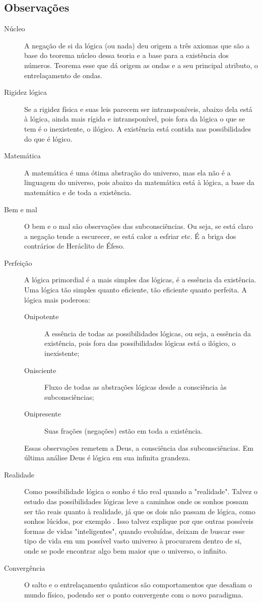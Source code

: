 \subsection{Observações}
	\begin{description}
	   \item[Núcleo] A negação de si da lógica (ou nada) deu origem a três axiomas que são a base do teorema núcleo dessa teoria e a base para a existência dos números. Teorema esse que dá origem as ondas e a seu principal atributo, o entrelaçamento de ondas. 
	   \item[Rigidez lógica] Se a rigidez física e suas leis parecem ser intransponíveis, abaixo dela está à lógica, ainda mais rígida e intransponível, pois fora da lógica o que se tem é o inexistente, o ilógico. A existência está contida nas possibilidades do que é lógico. 
	   \item[Matemática] A matemática é uma ótima abstração do universo, mas ela não é a linguagem do universo, pois abaixo da matemática está à lógica, a base da matemática e de toda a existência.
	   \item[Bem e mal] O bem e o mal são observações das subconsciências. Ou seja, se está claro a negação tende a escurecer, se está calor a esfriar etc. É a briga dos contrários de Heráclito de Éfeso.
	   \item[Perfeição] A lógica primordial é a mais simples das lógicas, é a essência da existência. Uma lógica tão simples quanto eficiente, tão eficiente quanto perfeita. A lógica mais poderosa:
	   \begin{description}
		   \item[Onipotente] A essência de todas as possibilidades lógicas, ou seja, a essência da existência, pois fora das possibilidades lógicas está o ilógico, o inexistente;
		   \item[Onisciente] Fluxo de todas as abstrações lógicas desde a consciência às subconsciências; 
		   \item[Onipresente] Suas frações (negações) estão em toda a existência.
	   \end{description}
	Essas observações remetem a Deus, a consciência das subconsciências. Em última análise Deus é lógica em sua infinita grandeza.
	   \item[Realidade] Como possibilidade lógica o sonho é tão real quando a "realidade". Talvez o estudo das possibilidades lógicas leve a caminhos onde os sonhos possam ser tão reais quanto à realidade, já que os dois não passam de lógica, como sonhos lúcidos, por exemplo \cite{ administradores_principio_pareto}. Isso talvez explique por que outras possíveis formas de vidas "inteligentes", quando evoluídas, deixam de buscar esse tipo de vida em um possível vasto universo à procurarem dentro de si, onde se pode encontrar algo bem maior que o universo, o infinito.
	   \item[Convergência] O salto e o entrelaçamento quânticos são comportamentos que desafiam o mundo físico, podendo ser o ponto convergente com o novo paradigma.
	\end{description}